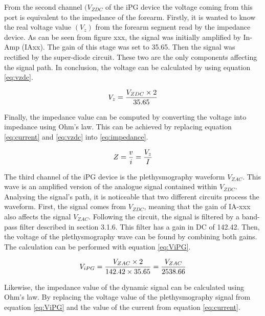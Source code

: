 From the second channel $(V_{ZDC}$ of the iPG device the voltage coming from this port is equivalent to the impedance of the forearm. Firstly, it is wanted to know the real voltage value  $(V_z)$ from the forearm segment read by the impedance device. As can be seen from figure xxx, the signal was initially amplified by In-Amp (IAxx). The gain of this stage was set to 35.65. Then the signal was rectified by the super-diode circuit. These two are the only components affecting the signal path. In conclusion, the voltage can be calculated by using equation \ref{eq:vzdc}.


\begin{align}
	\label{eq:vzdc}
	V_z = \frac{V_{ZDC} \times 2}{35.65} \tagaddtext{[\si{\volt}]}
\end{align}

Finally, the impedance value can be computed by converting the voltage into impedance using Ohm's law. This can be achieved by replacing equation \ref{eq:current} and \ref{eq:vzdc} into \ref{eq:impedance}.

\begin{align}
	\label{eq:impedance}
	Z = \frac{v}{i}=\frac{V_z}{I} \tagaddtext{[\si{\ohm}]}
\end{align}

The third channel of the iPG device is the plethysmography waveform $V_{ZAC}$. This wave is an amplified version of the analogue signal contained within $V_{ZDC}$. Analysing the signal's path, it is noticeable that two different circuits process the waveform. First, the signal comes from $V_{ZDC}$, meaning that the gain of IA-xxx also affects the signal $V_{ZAC}$. Following the circuit, the signal is filtered by a band-pass filter described in section 3.1.6. This filter has a gain in DC of 142.42. Then, the voltage of the plethysmography wave can be found by combining both gains. The calculation can be performed with equation \ref{eq:ViPG}.

\begin{align}
	\label{eq:ViPG}
	V_{iPG} = \frac{V_{ZAC} \times 2}{142.42 \times 35.65}=\frac{V_{ZAC}}{2538.66} \tagaddtext{[\si{\volt}]}
\end{align}


Likewise, the impedance value of the dynamic signal can be calculated using Ohm's law. By replacing the voltage value of the plethysmography signal from equation \ref{eq:ViPG} and the value of the current from equation \ref{eq:current}.


